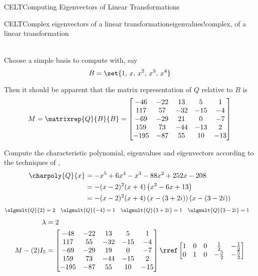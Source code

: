 \begin{subsect}{CELT}{Computing Eigenvectors of Linear Transformations}
\begin{example}{CELT}{Complex eigenvectors of a linear transformation}{eigenvalues!complex, of a linear transformation}
\begin{para}
\begin{align*}
\end{align*}
\end{para}
%
\begin{para}Choose a simple basis to compute with, say
%
\begin{equation*}
B=\set{1,\,x,\,x^2,\,x^3,\,x^4}
\end{equation*}
\end{para}
%
\begin{para}Then it should be apparent that the matrix representation of $Q$ relative to $B$ is
%
\begin{equation*}
M=\matrixrep{Q}{B}{B}=
\begin{bmatrix}
 -46 & -22 & 13 & 5 & 1 \\
 117 & 57 & -32 & -15 & -4 \\
 -69 & -29 & 21 & 0 & -7 \\
 159 & 73 & -44 & -13 & 2 \\
 -195 & -87 & 55 & 10 & -13
\end{bmatrix}
\end{equation*}
\end{para}
%
\begin{para}Compute the characteristic polynomial, eigenvalues and eigenvectors according to the techniques of ,
%
\begin{align*}
\charpoly{Q}{x}
&=-x^5+6 x^4-x^3-88 x^2+252 x-208\\
&=-(x-2)^2 (x+4) \left(x^2-6x+13\right)\\
&=-(x-2)^2 (x+4) \left(x-(3+2i)\right) \left(x-(3-2i)\right)\\
\end{align*}
%
%
\begin{align*}
\algmult{Q}{2}&=2
&
\algmult{Q}{-4}&=1
&
\algmult{Q}{3+2i}&=1
&
\algmult{Q}{3-2i}&=1
\end{align*}
%
\begin{align*}
\lambda&=2\\
M-(2)I_5&=
\begin{bmatrix}
 -48 & -22 & 13 & 5 & 1 \\
 117 & 55 & -32 & -15 & -4 \\
 -69 & -29 & 19 & 0 & -7 \\
 159 & 73 & -44 & -15 & 2 \\
 -195 & -87 & 55 & 10 & -15
\end{bmatrix}
\rref
\begin{bmatrix}
 1 & 0 & 0 & \frac{1}{2} & -\frac{1}{2} \\
 0 & 1 & 0 & -\frac{5}{2} & -\frac{5}{2} \\

\end{bmatrix}
\end{align*}
\end{para}
\end{example}
\end{subsect}
